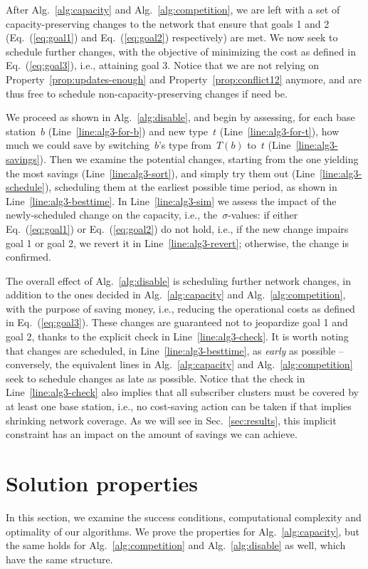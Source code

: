 \documentclass[10pt,journal,cspaper,compsoc]{IEEEtran}
\newcommand{\Sec}[1]{Sec.~\ref{sec:#1}}
\newcommand{\Eq}[1]{Eq.~(\ref{eq:#1})}
\newcommand{\Alg}[1]{Alg.~\ref{alg:#1}}
\newcommand{\Line}[1]{Line~\ref{line:#1}}
\newcommand{\Prop}[1]{Property~\ref{prop:#1}}
\begin{document}
After \Alg{capacity} and \Alg{competition}, we are left with a set of capacity-preserving changes to the network
that ensure that goals 1 and 2 (\Eq{goal1} and \Eq{goal2} respectively) are met.
We now seek to schedule further changes, with the objective of minimizing the cost as defined in \Eq{goal3}, i.e.,
attaining goal 3. Notice that we are not relying on \Prop{updates-enough} and \Prop{conflict12} anymore, and are
thus free to schedule non-capacity-preserving changes if need be.

We proceed as shown in \Alg{disable}, and begin by assessing, for each base station~$b$ (\Line{alg3-for-b}) and new type~$t$
(\Line{alg3-for-t}), how much we could save by switching~$b$'s type from~$T(b)$ to~$t$ (\Line{alg3-savings}). Then we examine
the potential changes, starting from the one yielding the most savings (\Line{alg3-sort}), and simply try them out (\Line{alg3-schedule}),
scheduling them at the earliest possible time period, as shown in \Line{alg3-besttime}. In \Line{alg3-sim} we assess the impact of
the newly-scheduled change on the capacity, i.e., the~$\sigma$-values: if either \Eq{goal1} or \Eq{goal2} do not hold, i.e., if
the new change impairs goal 1 or goal 2, we revert it in \Line{alg3-revert}; otherwise, the change is confirmed.

The overall effect of \Alg{disable} is scheduling further network changes, in addition to the ones decided in
\Alg{capacity} and \Alg{competition}, with the purpose of saving money, i.e., reducing the operational costs as defined in
\Eq{goal3}.
These changes are guaranteed not to jeopardize goal 1 and goal 2, thanks to the explicit check in \Line{alg3-check}.
It is worth noting that changes are scheduled, in \Line{alg3-besttime}, as {\em early} as possible -- conversely,
the equivalent lines in \Alg{capacity} and \Alg{competition} seek to schedule changes as late as possible.
Notice that the check in \Line{alg3-check} also implies that all subscriber clusters must be covered
by at least one base station, i.e., no cost-saving action can be taken if that implies shrinking
network coverage. As we will see in \Sec{results}, this implicit constraint has an impact on the
amount of savings we can achieve.

\section{Solution properties}
\label{sec:discussion}

In this section, we examine the success conditions,
computational complexity and optimality of our algorithms.
We prove the
properties for \Alg{capacity}, but the same holds for \Alg{competition} and
\Alg{disable} as well, which have the same structure.
\end{document}
